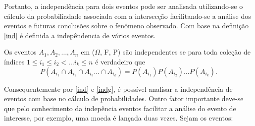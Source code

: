 Portanto, a independ\^{e}ncia para dois
eventos pode ser analisada utilizando-se o c\'{a}lculo da probabiliadade associada com a
intersec\c{c}\~{a}o facilitando-se a an\'{a}lise dos eventos e futuras conclus\~{o}es sobre o
fen\^{o}meno observado. Com base na defini\c c\~ao \autoref{ind} \'e definida a indep\^{e}ndencia de v\'{a}rios eventos.
	\begin{defin} 
		\label{indg}
		Os eventos $A_1,A_2,\dots ,A_n $ em ($\Omega$, F, P) s\~{a}o
		independentes se para toda cole\c{c}\~{a}o de \'{i}ndices $ 1 \leq i_1 \leq i_2 < \dots i_k \leq
		n $ \'e verdadeiro que 
		\begin{equation*}
			P(A_{i_1} \cap A_{i_2} \cap A_{i_3} \dots \cap A_{i_k}) = P(A_{i_1})P(A_{i_2}) \dots P(A_{i_k}).
		\end{equation*} 
	\end{defin}
Consequentemente por \ref{ind} e \ref{indg}, \'{e} poss\'{i}vel analisar a independ\^{e}ncia de eventos com base no
c\'{a}lculo de probabilidades. Outro fator importante deve-se que pelo conhecimento da indep\^encia eventos 
facilitar a an\'alise do evento de interesse, por exemplo, uma moeda \'{e} lan\c{c}ada duas
vezes. Sejam os eventos:

